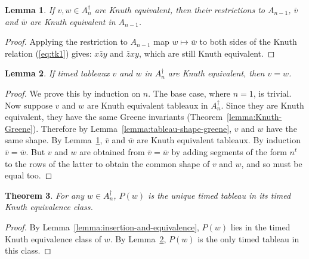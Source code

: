 \documentclass[12pt]{amsart}
\newtheorem{theorem}{Theorem}[subsection]
\newtheorem{lemma}[theorem]{Lemma}
\theoremstyle{definition}
\begin{document}
\begin{lemma}
  \label{lemma:equivalence-restriction}
  If $v,w\in A_n^\dagger$ are Knuth equivalent, then their restrictions to $A_{n-1}$, $\bar v$ and $\bar w$ are Knuth equivalent in $A_{n-1}$.
\end{lemma}
\begin{proof}
  Applying the restriction to $A_{n-1}$ map $w\mapsto \bar w$ to both sides of the Knuth relation (\ref{eq:tk1}) gives:
  $x\bar z y$ and $\bar z x y$, which are still Knuth equivalent.
\end{proof}
\begin{lemma}
  \label{lemma:uniqueness-in-class}
  If timed tableaux $v$ and $w$ in $A_n^\dagger$ are Knuth equivalent, then $v=w$.
\end{lemma}
\begin{proof}
  We prove this by induction on $n$.
  The base case, where $n=1$, is trivial.
  Now suppose $v$ and $w$ are Knuth equivalent tableaux in $A_n^\dagger$.
  Since they are Knuth equivalent, they have the same Greene invariants (Theorem~\ref{lemma:Knuth-Greene}).
  Therefore by Lemma~\ref{lemma:tableau-shape-greene}, $v$ and  $w$ have the same shape.
  By Lemma~\ref{lemma:equivalence-restriction}, $\bar v$ and $\bar w$ are Knuth equivalent tableaux.
  By induction $\bar v= \bar w$.
  But $v$ and $w$ are obtained from $\bar v=\bar w$ by adding segments of the form $n^t$ to the rows of the latter to obtain the common shape of $v$ and $w$, and so must be equal too.
\end{proof}
\begin{theorem}
  For any $w\in A_n^\dagger$, $P(w)$ is the unique timed tableau in its timed Knuth equivalence class.
\end{theorem}
\begin{proof}
  By Lemma~\ref{lemma:insertion-and-equivalence}, $P(w)$ lies in the timed Knuth equivalence class of $w$.
  By Lemma~\ref{lemma:uniqueness-in-class}, $P(w)$ is the only timed tableau in this class.
\end{proof}
\end{document}
